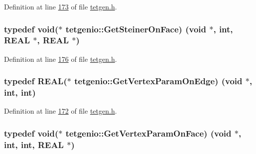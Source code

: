 Definition at line \hyperlink{tetgen_8h_source_l00173}{173} of file \hyperlink{tetgen_8h_source}{tetgen.\+h}.

\subsubsection[{\texorpdfstring{Get\+Steiner\+On\+Face}{GetSteinerOnFace}}]{\setlength{\rightskip}{0pt plus 5cm}typedef void($\ast$  tetgenio\+::\+Get\+Steiner\+On\+Face) (void $\ast$, int, {\bf R\+E\+AL} $\ast$, {\bf R\+E\+AL} $\ast$)}\hypertarget{classtetgenio_a3e77872e867758e38d5682a3042119d2}{}\label{classtetgenio_a3e77872e867758e38d5682a3042119d2}


Definition at line \hyperlink{tetgen_8h_source_l00176}{176} of file \hyperlink{tetgen_8h_source}{tetgen.\+h}.

\subsubsection[{\texorpdfstring{Get\+Vertex\+Param\+On\+Edge}{GetVertexParamOnEdge}}]{\setlength{\rightskip}{0pt plus 5cm}typedef {\bf R\+E\+AL}($\ast$  tetgenio\+::\+Get\+Vertex\+Param\+On\+Edge) (void $\ast$, int, int)}\hypertarget{classtetgenio_a9b66695edca7918733cccf3e44c95e3d}{}\label{classtetgenio_a9b66695edca7918733cccf3e44c95e3d}


Definition at line \hyperlink{tetgen_8h_source_l00172}{172} of file \hyperlink{tetgen_8h_source}{tetgen.\+h}.

\subsubsection[{\texorpdfstring{Get\+Vertex\+Param\+On\+Face}{GetVertexParamOnFace}}]{\setlength{\rightskip}{0pt plus 5cm}typedef void($\ast$  tetgenio\+::\+Get\+Vertex\+Param\+On\+Face) (void $\ast$, int, int, {\bf R\+E\+AL} $\ast$)}\hypertarget{classtetgenio_a331721b37f6937630548cb659642f926}{}\label{classtetgenio_a331721b37f6937630548cb659642f926}


